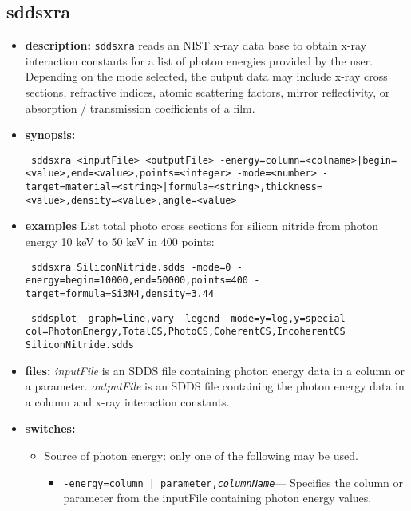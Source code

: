 
\begin{latexonly}
\newpage
\end{latexonly}
\subsection{sddsxra}
\label{sddsxra}

\begin{itemize}
\item {\bf description:}
\verb|sddsxra| reads an NIST x-ray data base to obtain x-ray interaction constants for a list of photon energies provided by the user. Depending on the mode selected, the output data may include x-ray cross sections, refractive indices, atomic scattering factors, mirror reflectivity, or absorption / transmission coefficients of a film. 
\item {\bf synopsis:} 
\begin{flushleft}{\tt
sddsxra <inputFile> <outputFile> -energy=column=<colname>|begin=<value>,end=<value>,points=<integer> 
-mode=<number> -target=material=<string>|formula=<string>,thickness=<value>,density=<value>,angle=<value>
}\end{flushleft}
\item {\bf examples} List total photo cross sections for silicon nitride from photon energy 10 keV to 50 keV in 400 points: 
\begin{flushleft}{\tt
 sddsxra SiliconNitride.sdds -mode=0 -energy=begin=10000,end=50000,points=400 -target=formula=Si3N4,density=3.44 
}\end{flushleft}
\begin{flushleft}{\tt
 sddsplot -graph=line,vary -legend -mode=y=log,y=special -col=PhotonEnergy,{TotalCS,PhotoCS,CoherentCS,IncoherentCS} SiliconNitride.sdds 
}\end{flushleft}
\item {\bf files:}
        {\em inputFile} is an SDDS file containing photon energy data in a column or a parameter. 
        {\em outputFile} is an SDDS file containing the photon energy data in a column and x-ray interaction constants. 
\item {\bf switches:}
    \begin{itemize}
    \item Source of photon energy: only one of the following may be used. 
         \begin{itemize}
          \item {\tt -energy={column | parameter},{\em columnName}}---
                  Specifies the column or parameter from the inputFile containing photon energy values. 

\end{itemize}
\end{itemize}
\end{itemize}
